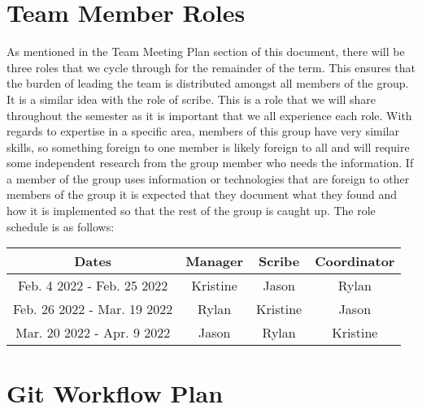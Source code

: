 \documentclass{article}
\begin{document}
\section{Team Member Roles}

As mentioned in the Team Meeting Plan section of this document, there will be three roles that we cycle through for the remainder of the term. This ensures that the burden of leading the team is distributed amongst all members of the group. It is a similar idea with the role of scribe. This is a role that we will share throughout the semester as it is important that we all experience each role. With regards to expertise in a specific area, members of this group have very similar skills, so something foreign to one member is likely foreign to all and will require some independent research from the group member who needs the information. If a member of the group uses information or technologies that are foreign to other members of the group it is expected that they document what they found and how it is implemented so that the rest of the group is caught up. The role schedule is as follows:

\begin{center}
\begin{tabular}{|c|c|c|c|} 
 \hline
 Dates & Manager & Scribe & Coordinator \\ [0.5ex] 
 \hline\hline
 Feb. 4 2022 - Feb. 25 2022 & Kristine & Jason & Rylan \\ 
 \hline
 Feb. 26 2022 - Mar. 19 2022 & Rylan & Kristine & Jason \\
 \hline
 Mar. 20 2022 - Apr. 9 2022 & Jason & Rylan & Kristine \\
 \hline
\end{tabular}
\end{center}

\section{Git Workflow Plan}
\end{document}
